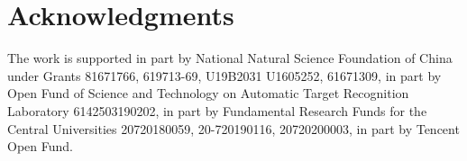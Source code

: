 \documentclass[a4paper,fleqn]{cas-dc}
\begin{document}
	
	\section{Acknowledgments}
	
	The work is supported in part by National Natural Science Foundation of China under Grants 81671766, 619713-69, U19B2031 U1605252, 61671309, in part by Open Fund of Science and Technology on Automatic Target Recognition Laboratory 6142503190202, in part by Fundamental Research Funds for the Central Universities 20720180059, 20-720190116, 20720200003, in part by Tencent Open Fund.
	
	
	

	

	
	
	
	
	
\end{document}
